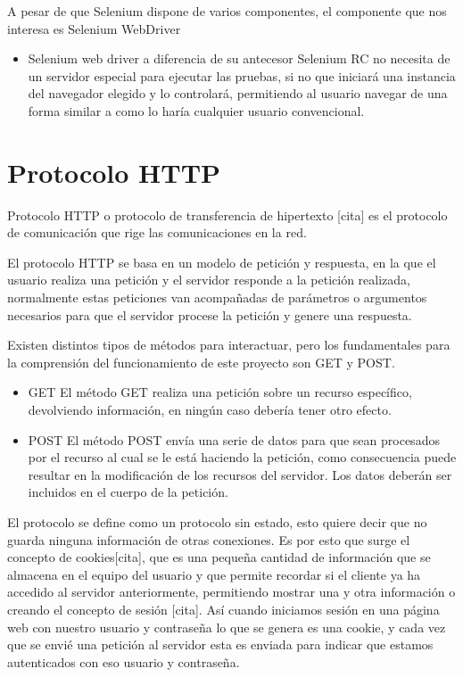 A pesar de que Selenium dispone de varios componentes, el componente que nos interesa es Selenium WebDriver 

\begin{itemize}
	\item Selenium web driver a diferencia de su antecesor Selenium RC no necesita de un servidor especial para ejecutar las pruebas, si no que 
iniciará una instancia del navegador elegido y lo controlará, permitiendo al usuario navegar de una forma similar a como lo haría cualquier usuario convencional.
\end{itemize}




\section{Protocolo HTTP}

Protocolo HTTP o protocolo de transferencia de hipertexto [cita] es el protocolo de comunicación que rige las comunicaciones en la red.

El protocolo HTTP se basa en un modelo de petición y respuesta, en la que el usuario realiza una petición y el servidor responde a la petición realizada, normalmente estas peticiones van acompañadas de parámetros o argumentos necesarios para que el servidor procese la petición y genere una respuesta.

Existen distintos tipos de métodos para interactuar, pero los fundamentales para la comprensión del funcionamiento de este proyecto son GET y POST.
\begin{itemize}
	\item	GET El método GET realiza una petición sobre un recurso específico, devolviendo información, en ningún caso debería tener otro efecto.
\item		POST El método POST envía una serie de datos para que sean procesados por el recurso al cual se le está haciendo la petición, como consecuencia puede resultar en la modificación de los recursos del servidor. Los datos deberán ser incluidos en el cuerpo de la petición.
\end{itemize}

 El protocolo se define como un protocolo sin estado, esto quiere decir que no guarda ninguna información de otras conexiones. Es por esto que surge el concepto de cookies[cita], que es una pequeña cantidad de información que se almacena en el equipo del usuario y que permite recordar si el cliente ya ha accedido al servidor anteriormente, permitiendo mostrar una y otra información o creando el concepto de sesión [cita]. Así cuando iniciamos sesión en una página web con nuestro usuario y contraseña lo que se genera es una cookie, y cada vez que se envié una petición al servidor esta es enviada para indicar que estamos autenticados con eso usuario y contraseña.

